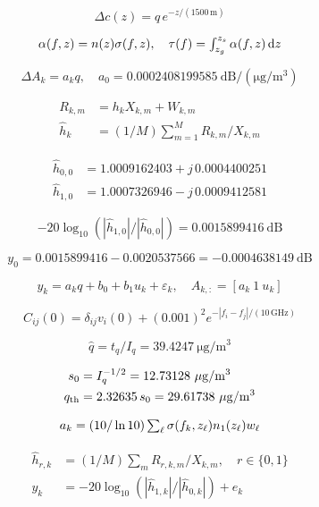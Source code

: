 \documentclass{article}
\begin{document}
\color{eqcolor}\fontsize{27}{36}\selectfont
\[\displaystyle \Delta c(z)=q\,e^{-z/(1500\,\mathrm m)}\]

\newpage
\[\displaystyle \textstyle\alpha(f,z)=n(z)\sigma(f,z),\quad\tau(f)=\int_{z_g}^{z_s}\alpha(f,z)\,\mathrm dz\]

\newpage
\[\displaystyle \Delta A_k=a_kq,\quad a_0=0.0002408199585\ \mathrm{dB}/(\mathrm{\mu g/m^3})\]

\newpage
\[\displaystyle \begin{aligned}R_{k,m}&=h_kX_{k,m}+W_{k,m}\\\widehat h_k&=(1/M)\textstyle\sum_{m=1}^{M}R_{k,m}/X_{k,m}\end{aligned}\]

\newpage
\[\displaystyle \begin{aligned}\widehat h_{0,0}&=1.0009162403+j\,0.0004400251\\\widehat h_{1,0}&=1.0007326946-j\,0.0009412581\end{aligned}\]

\newpage
\[\displaystyle -20\log_{10}(|\widehat h_{1,0}|/|\widehat h_{0,0}|)=0.0015899416\ \mathrm{dB}\]

\newpage
\[\displaystyle y_0=0.0015899416-0.0020537566=-0.0004638149\ \mathrm{dB}\]

\newpage
\[\displaystyle y_k=a_kq+b_0+b_1u_k+\varepsilon_k,\quad A_{k,:}=[a_k\ 1\ u_k]\]

\newpage
\[\displaystyle C_{ij}(0)=\delta_{ij}v_i(0)+(0.001)^2 e^{-|f_i-f_j|/(10\,\mathrm{GHz})}\]

\newpage
\[\displaystyle \widehat q=t_q/I_q=39.4247\ \mathrm{\mu g/m^3}\]

\newpage
\[\displaystyle \begin{aligned}s_0&=I_q^{-1/2}=12.73128\ \mathrm{\mu g/m^3}\\q_{\rm th}&=2.32635\,s_0=29.61738\ \mathrm{\mu g/m^3}\end{aligned}\]

\newpage
\[\displaystyle \textstyle a_k=(10/\ln10)\sum_\ell\sigma(f_k,z_\ell)n_1(z_\ell)w_\ell\]

\newpage
\[\displaystyle \begin{aligned}\widehat h_{r,k}&=(1/M)\textstyle\sum_m R_{r,k,m}/X_{k,m},\quad r\in\{0,1\}\\y_k&=-20\log_{10}(|\widehat h_{1,k}|/|\widehat h_{0,k}|)+e_k\end{aligned}\]
\end{document}
